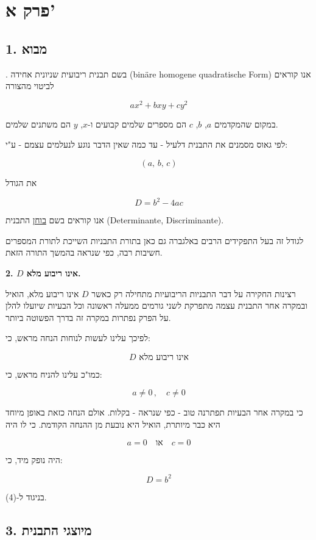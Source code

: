 \newpage

\section*{פרק א'}

\subsection*{1. מבוא}

. בשם תבנית ריבועית שניונית אחידה (binäre homogene quadratische Form) אנו קוראים לביטוי מהצורה

\[ ax^2 + bxy + cy^2 \tag{1} \]

במקום שהמקדמים $a$, $b$, $c$ הם מספרים שלמים קבועים ו-$x$, $y$ הם משתנים שלמים.

\medskip
לפי גאוס מסמנים את התבנית דלעיל - עד כמה שאין הדבר נוגע לנעלמים עצמם - ע"י:

\[ (a,\, b,\, c) \tag{2} \]

את הגודל

\[ D = b^2 - 4ac \tag{3} \]

אנו קוראים בשם \underline{בוחן} התבנית (Determinante, Discriminante).

\medskip
לגודל זה בעל התפקידים הרבים באלגברה גם כאן בתורת התבניות השייכת לתורת המספרים חשיבות רבה, כפי שנראה בהמשך התורה הזאת.

\medskip
\noindent\textbf{2. $D$ אינו ריבוע מלא.}

רצינות החקירה על דבר התבניות הריבועיות מתחילה רק כאשר $D$ אינו ריבוע מלא, הואיל ובמקרה אחר התבנית עצמה מתפרקת לשני גורמים ממעלה ראשונה וכל הבעיות שיועלו להלן על הפרק נפתרות במקרה זה בדרך הפשוטה ביותר.

\medskip
לפיכך עלינו לעשות לנוחות הנחה מראש, כי:

\[ \boxed{D \text{ אינו ריבוע מלא}} \tag{4} \]

כמו"כ עלינו להניח מראש, כי:

\[ a \neq 0 \, , \quad c \neq 0 \tag{5} \]

כי במקרה אחר הבעיות תפתרנה טוב - כפי שנראה - בקלות. אולם הנחה כזאת באופן מיוחד היא כבר מיותרת, הואיל היא נובעת מן ההנחה הקודמת. כי לו היה

\[ a = 0 \quad \text{או} \quad c = 0 \]

היה נופק מיד, כי:

\[ D = b^2 \]

בניגוד ל-(4).

\subsection*{3. מיוצגי התבנית}

